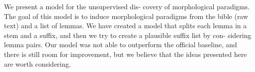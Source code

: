 We present a model for the unsupervised dis- covery of morphological paradigms. The goal of this model is to induce morphological paradigms from the bible (raw text) and a list of lemmas. We have created a model that splits each lemma in a stem and a suffix, and then we try to create a plausible suffix list by con- sidering lemma pairs. Our model was not able to outperform the official baseline, and there is still room for improvement, but we believe that the ideas presented here are worth considering.
